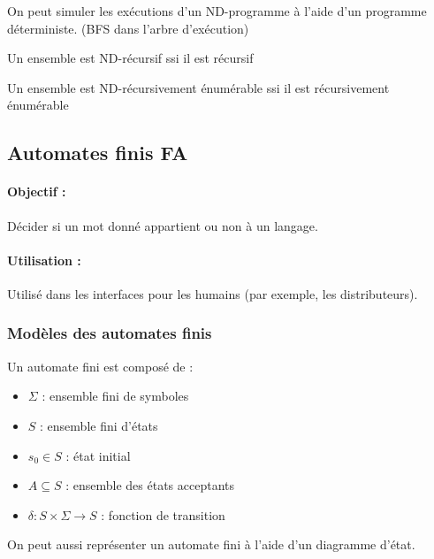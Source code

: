 \begin{myprop}
	On peut simuler les exécutions d'un ND-programme à l'aide d'un programme 
	déterministe. (BFS dans l'arbre d'exécution)
\end{myprop}

\begin{myprop}
	Un ensemble est ND-récursif ssi il est récursif
\end{myprop}

\begin{myprop}
	Un ensemble est ND-récursivement énumérable ssi il est récursivement 
	énumérable
\end{myprop}

\subsection{Automates finis FA}
\label{sub:automates_finis}

\paragraph{Objectif :} Décider si un mot donné appartient ou non à un langage.

\paragraph{Utilisation :} Utilisé dans les interfaces pour les humains (par 
exemple, les distributeurs).

\subsubsection{Modèles des automates finis}
\label{ssub:mod_les_des_automates_finis}
Un automate fini est composé de :

\begin{itemize}
	\item $\Sigma$ : ensemble fini de symboles
	\item $S$ : ensemble fini d'états
	\item $s_0 \in S$ : état initial
	\item $A \subseteq S$ : ensemble des états acceptants
	\item $\delta: S \times \Sigma \rightarrow S$ : fonction de transition
\end{itemize}

\begin{myrem}
	On peut aussi représenter un automate fini à l'aide d'un diagramme 
	d'état.
\end{myrem}

